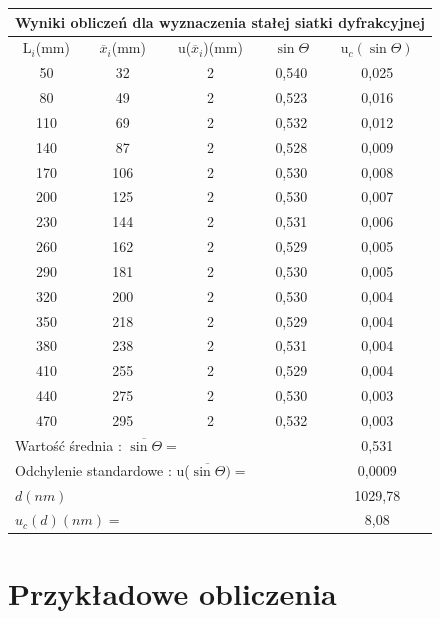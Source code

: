 \documentclass[12pt]{article}
\begin{document}
\begin{table}[!htbp]
    \centering
    \begin{adjustbox}{width=1\textwidth}
    \begin{tabular}{|c|c|c|c|c|}
    \hline
    \multicolumn{5}{|c|}{Wyniki obliczeń dla wyznaczenia stałej siatki dyfrakcyjnej} \\
    \hline
        L$_i$(mm) & $\overline{x}_i$(mm) & u($\overline{x}_i$)(mm) & $\sin \Theta$ & u$_c(\sin \Theta)$ \\ \hline
        50 & 32 & 2 & 0,540 & 0,025 \\ \hline
        80 & 49 & 2 & 0,523 & 0,016 \\ \hline
        110 & 69 & 2 & 0,532 & 0,012 \\ \hline
        140 & 87 & 2 & 0,528 & 0,009 \\ \hline
        170 & 106 & 2 & 0,530 & 0,008 \\ \hline
        200 & 125 & 2 & 0,530 & 0,007 \\ \hline
        230 & 144 & 2 & 0,531 & 0,006 \\ \hline
        260 & 162 & 2 & 0,529 & 0,005 \\ \hline
        290 & 181 & 2 & 0,530 & 0,005 \\ \hline
        320 & 200 & 2 & 0,530 & 0,004 \\ \hline
        350 & 218 & 2 & 0,529 & 0,004 \\ \hline
        380 & 238 & 2 & 0,531 & 0,004 \\ \hline
        410 & 255 & 2 & 0,529 & 0,004 \\ \hline
        440 & 275 & 2 & 0,530 & 0,003 \\ \hline
        470 & 295 & 2 & 0,532 & 0,003 \\ \hline
    \multicolumn{4}{|l|}{Wartość średnia : $\overline{\sin \Theta}=$} & 0,531 \\ \hline
    \multicolumn{4}{|l|}{Odchylenie standardowe : u($\overline{\sin \Theta})=$} & 0,0009 \\ \hline
    \multicolumn{4}{|l|}{$d(nm)$} & 1029,78 \\ \hline
    \multicolumn{4}{|l|}{$u_c(d)(nm)=$} & 8,08 \\ \hline
    \end{tabular}
\end{adjustbox}
\end{table}


\section{Przykładowe obliczenia}
\end{document}
